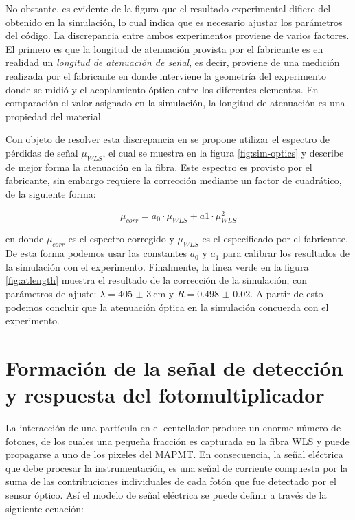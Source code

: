 No obstante, es evidente de la figura que el resultado experimental difiere del obtenido en la simulación, lo cual indica que es necesario ajustar los parámetros del código. La discrepancia entre ambos experimentos proviene de varios factores. El primero es que la longitud de atenuación provista por el fabricante es en realidad un \emph{longitud de atenuación de señal}, es decir, proviene de una medición realizada por el fabricante en donde interviene la geometría del experimento donde se midió y el acoplamiento óptico entre los diferentes elementos. En comparación el valor asignado en la simulación, la longitud de atenuación es una propiedad del material.

Con objeto de resolver esta discrepancia en \cite{dietz16} se propone utilizar el espectro de pérdidas de señal $\mu_{WLS}$, el cual se muestra en la figura \ref{fig:sim-optics} y describe de mejor forma la atenuación en la fibra. Este espectro es provisto por el fabricante, sin embargo requiere la corrección mediante un factor de cuadrático, de la siguiente forma:

\begin{equation}
\label{equ:quadcorr}
\mu_{corr}=a_{0}\cdot\mu_{WLS}+a{1}\cdot\mu^{2}_{WLS}
\end{equation}

en donde $\mu_{corr}$ es el espectro corregido y $\mu_{WLS}$ es el especificado por el fabricante. De esta forma podemos usar las constantes $a_{0}$ y $a_{1}$ para calibrar los resultados de la simulación con el experimento. Finalmente, la linea verde en la figura \ref{fig:atlength} muestra el resultado de la corrección de la simulación, con parámetros de ajuste: $\lambda=\SI{405(3)}{\cm}$ y $R=\num{0.498(20)}$. A partir de esto podemos concluir que la atenuación óptica en la simulación concuerda con el experimento.

\section{Formación de la señal de detección y respuesta del fotomultiplicador}

La interacción de una partícula en el centellador produce un enorme número de fotones, de los cuales una pequeña fracción es capturada en la fibra WLS y puede propagarse a uno de los pixeles del MAPMT. En consecuencia, la señal eléctrica que debe procesar la instrumentación, es una señal de corriente compuesta por la suma de las contribuciones individuales de cada fotón que fue detectado por el sensor óptico. Así el modelo de señal eléctrica se puede definir a través de la siguiente ecuación:

